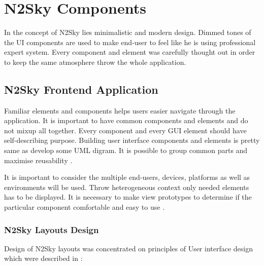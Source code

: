 \section{N2Sky Components}\label{N2Sky Components}

In the concept of N2Sky lies minimalistic and modern design. Dimmed tones of the UI components are used to make end-user to feel like he is using professional expert system. Every component and element was carefully thought out in order to keep the same atmosphere throw the whole application. 

\subsection{N2Sky Frontend Application}\label{N2Sky Frontend Application}


Familiar elements and components helps users easier navigate through the application. It is important to have common components and elements and do not mixup all together. Every component and every GUI element should have self-describing purpose. Building user interface components and elements is pretty same as develop some UML digram. It is possible to group common parts and maximise reusability \cite{mod_ui_book}. 

It is important to consider the multiple end-users, devices, platforms as well as environments will be used. Throw heterogeneous context only needed elements has to be displayed. It is necessary to make view prototypes to determine if the particular component comfortable and easy to use \cite{Martinez2017}. 

\subsubsection{N2Sky Layouts Design}\label{N2Sky Layouts Design}


Design of N2Sky layouts was concentrated on principles of User interface design which were described in \cite{gui_layout}: 

